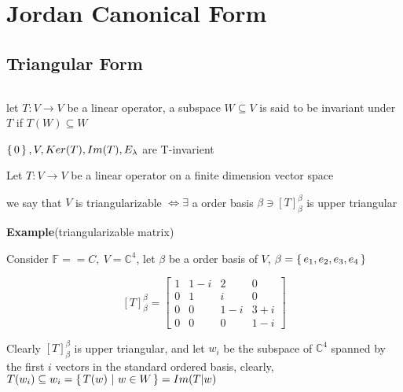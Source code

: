 


\cfoot{\thepage} %



\section{Jordan Canonical Form}

\subsection{Triangular Form}$ $


\begin{defn}
	let $T:V \rightarrow V$ be a linear operator, a subspace $W \subseteq V$ is said to be invariant under $T$ if $T(W) \subseteq W$
\end{defn}

\begin{tcolorbox}
	\begin{rmk*}
		$\left\{ \,0 \,\right\},V,Ker(T),Im(T),E_{\lambda}$ are T-invarient
	\end{rmk*}
\end{tcolorbox}

\begin{defn}
	Let $T:V \rightarrow V$ be a linear operator on a finite dimension vector space
	
	we say that $V$ is triangularizable $\Leftrightarrow \exists$ a order basis $\beta \ni [T]^{\beta}_{\beta}$ is upper triangular  
\end{defn}

\textbf{Example}(triangularizable matrix)

\begin{tcolorbox}
	Consider $\mathbb F = \mathbb = C,~V = \mathbb C^4$, let $\beta$ be a order basis of $V$, $\beta = \left\{ \,e_1,e_2,e_3,e_4 \,\right\}$
	
	$$[T]^{\beta}_{\beta} = \left[ \begin{matrix}
		1&1-i&2&0\\
		0&1&i&0\\
		0&0&1-i&3+i\\
		0&0&0&1-i
	\end{matrix}\right]$$
	
	Clearly $[T]^{\beta}_{\beta}$ is upper triangular, and let $w_i$ be the subspace of $\mathbb C^4$ spanned by the first $i$ vectors in the standard ordered basis, clearly, $T(w_i) \subseteq w_i = \left\{ \,T(w)~|~w\in W \,\right\} = Im(T|w)$
\end{tcolorbox}

